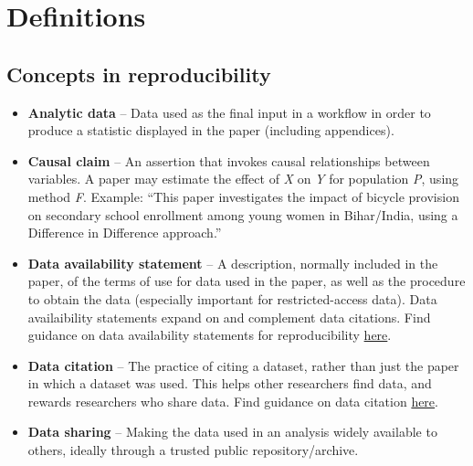 \documentclass[]{book}
\providecommand{\tightlist}{%
  \setlength{\itemsep}{0pt}\setlength{\parskip}{0pt}}
\begin{document}
\hypertarget{definitions}{%
\chapter{Definitions}\label{definitions}}

\hypertarget{concepts-in-reproducibility}{%
\section{Concepts in reproducibility}\label{concepts-in-reproducibility}}

\begin{itemize}
\tightlist
\item
  \textbf{Analytic data} -- Data used as the final input in a workflow in order to produce a statistic displayed in the paper (including appendices).\\
\item
  \textbf{Causal claim} -- An assertion that invokes causal relationships between variables. A paper may estimate the effect of \emph{X} on \emph{Y} for population \emph{P}, using method \emph{F}. Example: ``This paper investigates the impact of bicycle provision on secondary school enrollment among young women in Bihar/India, using a Difference in Difference approach.''\\
\item
  \textbf{Data availability statement} -- A description, normally included in the paper, of the terms of use for data used in the paper, as well as the procedure to obtain the data (especially important for restricted-access data). Data availaibility statements expand on and complement data citations. Find guidance on data availability statements for reproducibility \href{https://social-science-data-editors.github.io/guidance/Requested_information_dcas.html\#what-are-data-and-code-availability-statements-dcas}{here}.\\
\item
  \textbf{Data citation} -- The practice of citing a dataset, rather than just the paper in which a dataset was used. This helps other researchers find data, and rewards researchers who share data. Find guidance on data citation \href{https://social-science-data-editors.github.io/guidance/Data_citation_guidance.html}{here}.\\
\item
  \textbf{Data sharing} -- Making the data used in an analysis widely available to others, ideally through a trusted public repository/archive.\\

\end{itemize}
\end{document}
